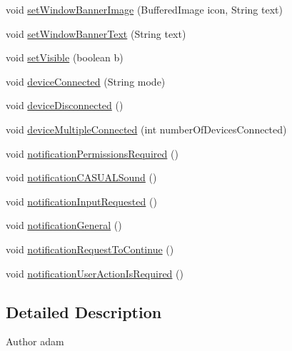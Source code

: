 \begin{DoxyCompactItemize}
\item 
void \hyperlink{interfaceCASUAL_1_1iCASUALGUI_ab40b2bd85be375159b9e764f53f185ec}{set\-Window\-Banner\-Image} (Buffered\-Image icon, String text)
\item 
void \hyperlink{interfaceCASUAL_1_1iCASUALGUI_a4f23768f43fa4cfe9b6bfce1b9cedb6d}{set\-Window\-Banner\-Text} (String text)
\item 
void \hyperlink{interfaceCASUAL_1_1iCASUALGUI_a94783dbf5d258d8a5bb516d03fba14f8}{set\-Visible} (boolean b)
\item 
void \hyperlink{interfaceCASUAL_1_1iCASUALGUI_a1d118a6e2fa316d2a1e90256a0572795}{device\-Connected} (String mode)
\item 
void \hyperlink{interfaceCASUAL_1_1iCASUALGUI_a360c068814d6714ff427d2bced13c6d2}{device\-Disconnected} ()
\item 
void \hyperlink{interfaceCASUAL_1_1iCASUALGUI_a14f848e7113fb3488549d5c00bd9e751}{device\-Multiple\-Connected} (int number\-Of\-Devices\-Connected)
\item 
void \hyperlink{interfaceCASUAL_1_1iCASUALGUI_a601a31c3779aaf519ce85b77cc2ca753}{notification\-Permissions\-Required} ()
\item 
void \hyperlink{interfaceCASUAL_1_1iCASUALGUI_a8ed1e2eeb8018c79935326542fbe66e7}{notification\-C\-A\-S\-U\-A\-L\-Sound} ()
\item 
void \hyperlink{interfaceCASUAL_1_1iCASUALGUI_aadb0d6eaf13ea440f2fde52635686aba}{notification\-Input\-Requested} ()
\item 
void \hyperlink{interfaceCASUAL_1_1iCASUALGUI_afb18773fbee213dccef143061f8d8b32}{notification\-General} ()
\item 
void \hyperlink{interfaceCASUAL_1_1iCASUALGUI_ab7b99ad8c318f392a4d757239c25b773}{notification\-Request\-To\-Continue} ()
\item 
void \hyperlink{interfaceCASUAL_1_1iCASUALGUI_a840b79c54833bb3292f227b2d8244d17}{notification\-User\-Action\-Is\-Required} ()
\end{DoxyCompactItemize}


\subsection{Detailed Description}
\begin{DoxyAuthor}{Author}
adam 
\end{DoxyAuthor}


